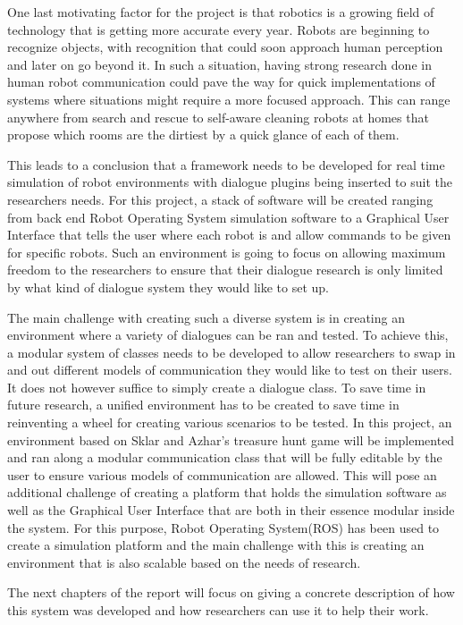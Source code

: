 \documentclass[11pt]{informatics-report}
\begin{document}
    One last motivating factor for the project is that robotics is a growing field of technology that is getting more accurate every year. Robots are beginning to recognize objects, with recognition that could soon approach human perception and later on go beyond it. In such a situation, having strong research done in human robot communication could pave the way for quick implementations of systems where situations might require a more focused approach. This can range anywhere from search and rescue to self-aware cleaning robots at homes that propose which rooms are the dirtiest by a quick glance of each of them.

    This leads to a conclusion that a framework needs to be developed for real time simulation of robot environments with dialogue plugins being inserted to suit the researchers needs. For this project, a stack of software will be created ranging from back end Robot Operating System simulation software to a Graphical User Interface that tells the user where each robot is and allow commands to be given for specific robots. Such an environment is going to focus on allowing maximum freedom to the researchers to ensure that their dialogue research is only limited by what kind of dialogue system they would like to set up.

    The main challenge with creating such a diverse system is in creating an environment where a variety of dialogues can be ran and tested. To achieve this, a modular system of classes needs to be developed to allow researchers to swap in and out different models of communication they would like to test on their users. It does not however suffice to simply create a dialogue class. To save time in future research, a unified environment has to be created to save time in reinventing a wheel for creating various scenarios to be tested. In this project, an environment based on Sklar and Azhar's treasure hunt game will be implemented and ran along a modular communication class that will be fully editable by the user to ensure various models of communication are allowed. This will pose an additional challenge of creating a platform that holds the simulation software as well as the Graphical User Interface that are both in their essence modular inside the system. For this purpose, Robot Operating System(ROS) has been used to create a simulation platform and the main challenge with this is creating an environment that is also scalable based on the needs of research.

    The next chapters of the report will focus on giving a concrete description of how this system was developed and how researchers can use it to help their work.
\end{document}
